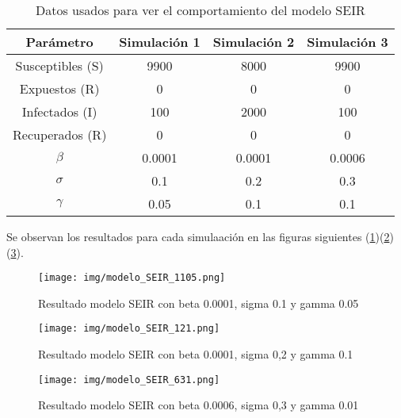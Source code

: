 \begin{table}[H]
\centering
\begin{tabular}{|c|c|c|c|}
\hline
\textbf{Parámetro} & \textbf{Simulación 1} & \textbf{Simulación 2}  & \textbf{Simulación 3}\\
\hline
Susceptibles (S) & 9900 & 8000 & 9900\\
\hline
Expuestos (R)   &  0   & 0 & 0  \\
\hline
Infectados (I)   & 100   & 2000 & 100  \\
\hline
Recuperados (R)   &  0   & 0 & 0  \\
\hline
\(\beta\)        & 0.0001 & 0.0001  & 0.0006\\
\hline
\(\sigma\)        & 0.1 & 0.2  & 0.3\\
\hline
\(\gamma\)        & 0.05 & 0.1 & 0.1\\
\hline
\end{tabular}
\caption{Datos usados para ver el comportamiento del modelo SEIR}
\label{tab:datos para modelo SEIR}
\end{table}

Se observan los resultados para cada simulaación en las figuras siguientes (\ref{fig:Simulación 1 SEIR})(\ref{fig:Simulación 2 SEIR})(\ref{fig:Simulación 3 SEIR}).

\begin{figure}[H]
    \centering
    \texttt{[image: img/modelo\_SEIR\_1105.png]}
    \caption{Resultado modelo SEIR con beta 0.0001, sigma 0.1 y gamma 0.05}
    \label{fig:Simulación 1 SEIR}
    \vspace{0.5cm} %
\end{figure}

\begin{figure}[H]
    \centering
    \texttt{[image: img/modelo\_SEIR\_121.png]}
    \caption{Resultado modelo SEIR con beta 0.0001, sigma 0,2 y gamma 0.1}
    \label{fig:Simulación 2 SEIR}
    \vspace{0.5cm} %
\end{figure}

\begin{figure}[H]
    \centering
    \texttt{[image: img/modelo\_SEIR\_631.png]}
    \caption{Resultado modelo SEIR con beta 0.0006, sigma 0,3 y gamma 0.01}
    \label{fig:Simulación 3 SEIR}
    \vspace{0.5cm} %
\end{figure}

